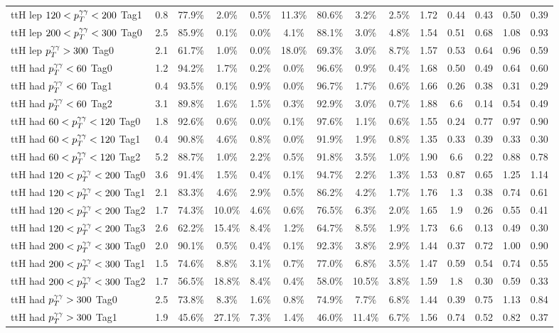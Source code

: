 \begin{tabular}{l|ccccccccc|c|ccc}
     ttH lep $120<p_T^{\gamma\gamma}<200$ Tag1 & 0.8 & 77.9\% & 2.0\% & 0.5\% & 11.3\% & 80.6\% & 3.2\% & 2.5\% & 1.72 & 0.44 & 0.43 & 0.50 & 0.39 \\
     [\cmsTabSkip]
     ttH lep $200<p_T^{\gamma\gamma}<300$ Tag0 & 2.5 & 85.9\% & 0.1\% & 0.0\% & 4.1\% & 88.1\% & 3.0\% & 4.8\% & 1.54 & 0.51 & 0.68 & 1.08 & 0.93 \\
     [\cmsTabSkip]
     ttH lep $p_T^{\gamma\gamma}>300$ Tag0 & 2.1 & 61.7\% & 1.0\% & 0.0\% & 18.0\% & 69.3\% & 3.0\% & 8.7\% & 1.57 & 0.53 & 0.64 & 0.96 & 0.59 \\
     [\cmsTabSkip]
     ttH had $p_T^{\gamma\gamma}<60$ Tag0 & 1.2 & 94.2\% & 1.7\% & 0.2\% & 0.0\% & 96.6\% & 0.9\% & 0.4\% & 1.68 & 0.50 & 0.49 & 0.64 & 0.60 \\
     ttH had $p_T^{\gamma\gamma}<60$ Tag1 & 0.4 & 93.5\% & 0.1\% & 0.9\% & 0.0\% & 96.7\% & 1.7\% & 0.6\% & 1.66 & 0.26 & 0.38 & 0.31 & 0.29 \\
     ttH had $p_T^{\gamma\gamma}<60$ Tag2 & 3.1 & 89.8\% & 1.6\% & 1.5\% & 0.3\% & 92.9\% & 3.0\% & 0.7\% & 1.88 & 6.6 & 0.14 & 0.54 & 0.49 \\
     [\cmsTabSkip]
     ttH had $60<p_T^{\gamma\gamma}<120$ Tag0 & 1.8 & 92.6\% & 0.6\% & 0.0\% & 0.1\% & 97.6\% & 1.1\% & 0.6\% & 1.55 & 0.24 & 0.77 & 0.97 & 0.90 \\
     ttH had $60<p_T^{\gamma\gamma}<120$ Tag1 & 0.4 & 90.8\% & 4.6\% & 0.8\% & 0.0\% & 91.9\% & 1.9\% & 0.8\% & 1.35 & 0.33 & 0.39 & 0.33 & 0.30 \\
     ttH had $60<p_T^{\gamma\gamma}<120$ Tag2 & 5.2 & 88.7\% & 1.0\% & 2.2\% & 0.5\% & 91.8\% & 3.5\% & 1.0\% & 1.90 & 6.6 & 0.22 & 0.88 & 0.78 \\
     [\cmsTabSkip]
     ttH had $120<p_T^{\gamma\gamma}<200$ Tag0 & 3.6 & 91.4\% & 1.5\% & 0.4\% & 0.1\% & 94.7\% & 2.2\% & 1.3\% & 1.53 & 0.87 & 0.65 & 1.25 & 1.14 \\
     ttH had $120<p_T^{\gamma\gamma}<200$ Tag1 & 2.1 & 83.3\% & 4.6\% & 2.9\% & 0.5\% & 86.2\% & 4.2\% & 1.7\% & 1.76 & 1.3 & 0.38 & 0.74 & 0.61 \\
     ttH had $120<p_T^{\gamma\gamma}<200$ Tag2 & 1.7 & 74.3\% & 10.0\% & 4.6\% & 0.6\% & 76.5\% & 6.3\% & 2.0\% & 1.65 & 1.9 & 0.26 & 0.55 & 0.41 \\
     ttH had $120<p_T^{\gamma\gamma}<200$ Tag3 & 2.6 & 62.2\% & 15.4\% & 8.4\% & 1.2\% & 64.7\% & 8.5\% & 1.9\% & 1.73 & 6.6 & 0.13 & 0.49 & 0.30 \\
     [\cmsTabSkip]
     ttH had $200<p_T^{\gamma\gamma}<300$ Tag0 & 2.0 & 90.1\% & 0.5\% & 0.4\% & 0.1\% & 92.3\% & 3.8\% & 2.9\% & 1.44 & 0.37 & 0.72 & 1.00 & 0.90 \\
     ttH had $200<p_T^{\gamma\gamma}<300$ Tag1 & 1.5 & 74.6\% & 8.8\% & 3.1\% & 0.7\% & 77.0\% & 6.8\% & 3.5\% & 1.47 & 0.59 & 0.54 & 0.74 & 0.55 \\
     ttH had $200<p_T^{\gamma\gamma}<300$ Tag2 & 1.7 & 56.5\% & 18.8\% & 8.4\% & 0.4\% & 58.0\% & 10.5\% & 3.8\% & 1.59 & 1.8 & 0.30 & 0.59 & 0.33 \\
     [\cmsTabSkip]
     ttH had $p_T^{\gamma\gamma}>300$ Tag0 & 2.5 & 73.8\% & 8.3\% & 1.6\% & 0.8\% & 74.9\% & 7.7\% & 6.8\% & 1.44 & 0.39 & 0.75 & 1.13 & 0.84 \\
     ttH had $p_T^{\gamma\gamma}>300$ Tag1 & 1.9 & 45.6\% & 27.1\% & 7.3\% & 1.4\% & 46.0\% & 11.4\% & 6.7\% & 1.56 & 0.74 & 0.52 & 0.82 & 0.37 \\
     [\cmsTabSkip]
\end{tabular}